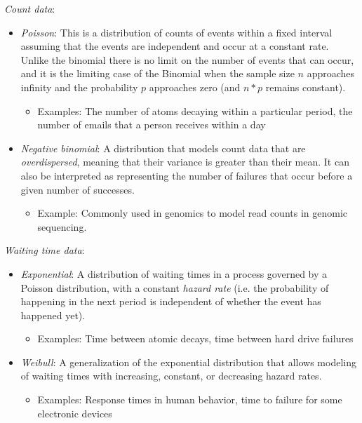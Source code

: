 \textit{Count data}:

\begin{itemize}
\item \textit{Poisson}: This is a distribution of counts of events within a fixed interval assuming that the events are independent and occur at a constant rate. Unlike the binomial there is no limit on the number of events that can occur, and it is the limiting case of the Binomial when the sample size $n$ approaches infinity and the probability $p$ approaches zero (and $n * p$ remains constant).

\begin{itemize}
\item Examples: The number of atoms decaying within a particular period, the number of emails that a person receives within a day
\end{itemize}


\item \textit{Negative binomial}: A distribution that models count data that are \textit{overdispersed}, meaning that their variance is greater than their mean.  It can also be interpreted as representing the number of failures that occur before a given number of successes.

\begin{itemize}
\item Example: Commonly used in genomics to model read counts in genomic sequencing.
\end{itemize}
\end{itemize}

\textit{Waiting time data}:

\begin{itemize}
\item \textit{Exponential}: A distribution of waiting times in a process governed by a Poisson distribution, with a constant \textit{hazard rate} (i.e. the probability of happening in the next period is independent of whether the event has happened yet).

\begin{itemize}
\item Examples: Time between atomic decays, time between hard drive failures
\end{itemize}


\item \textit{Weibull}: A generalization of the exponential distribution that allows modeling of waiting times with increasing, constant, or decreasing hazard rates.

\begin{itemize}
\item Examples: Response times in human behavior, time to failure for some electronic devices
\end{itemize}
\end{itemize}

